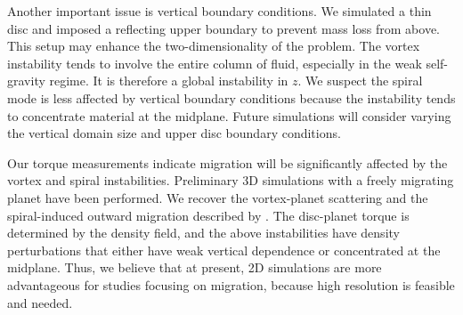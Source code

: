 Another important issue is vertical boundary conditions. We simulated
a thin disc and imposed a reflecting upper boundary to prevent mass
loss from above. This setup  may enhance the two-dimensionality
of the problem. The vortex instability tends to involve the 
entire column of fluid, especially in the weak self-gravity regime. It
is therefore a global instability in $z$. We suspect the spiral mode
is less affected by vertical boundary conditions because the
instability tends to concentrate material at the midplane. Future
simulations will consider varying the vertical domain size and upper
disc boundary conditions. 

Our torque measurements indicate migration will be significantly
affected by the vortex and spiral instabilities. Preliminary 3D
simulations with a freely migrating planet have been performed. We
recover the vortex-planet scattering and the spiral-induced outward
migration described by \cite{lin10,lin12b}.   
The disc-planet torque is determined by the density field, and
the above instabilities have density perturbations that either
have weak vertical dependence or concentrated at the midplane. Thus, we
believe that at present, 2D simulations are more advantageous for studies
focusing on migration, because high resolution is feasible and needed.   
